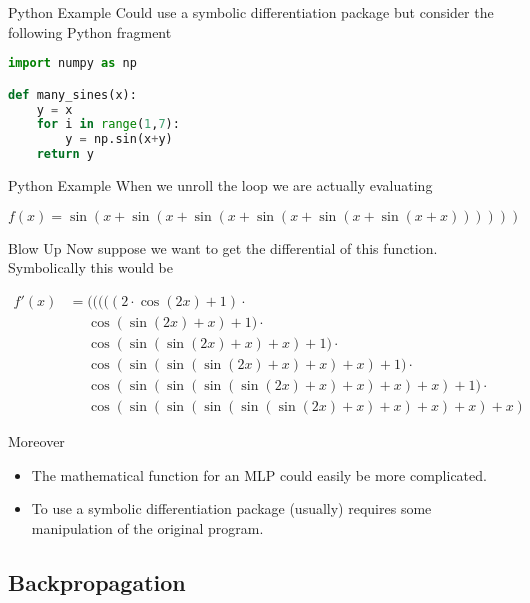 \documentclass{beamer}
\begin{document}
\begin{frame}[fragile]{Python Example}
  Could use a symbolic differentiation package but consider the
  following Python fragment
\begin{lstlisting}[language=Python]
import numpy as np

def many_sines(x):
    y = x
    for i in range(1,7):
        y = np.sin(x+y)
    return y
\end{lstlisting}
\end{frame}

\begin{frame}[fragile]{Python Example}
When we unroll the loop we are actually evaluating

$$
f(x) = \sin(x + \sin(x + \sin(x + \sin(x + \sin(x + \sin(x + x))))))
$$

\end{frame}

\begin{frame}[fragile]{Blow Up}
Now suppose we want to get the differential of this
function. Symbolically this would be

$$
\begin{aligned}
f'(x) &=           (((((2\cdot \cos(2x)+1)\cdot \\
      &\phantom{=} \cos(\sin(2x)+x)+1)\cdot \\
      &\phantom{=} \cos(\sin(\sin(2x)+x)+x)+1)\cdot \\
      &\phantom{=} \cos(\sin(\sin(\sin(2x)+x)+x)+x)+1)\cdot \\
      &\phantom{=} \cos(\sin(\sin(\sin(\sin(2x)+x)+x)+x)+x)+1)\cdot \\
      &\phantom{=} \cos(\sin(\sin(\sin(\sin(\sin(2x)+x)+x)+x)+x)+x)
\end{aligned}
$$
\end{frame}

\begin{frame}[fragile]{Moreover}
\begin{itemize}
\item The mathematical function for an MLP could easily be more
  complicated.
\pause
\item To use a symbolic differentiation package (usually) requires
  some manipulation of the original program.
\end{itemize}
\end{frame}

\subsection{Backpropagation}
\end{document}
